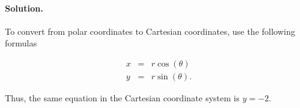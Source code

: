 
\paragraph{Solution.}

To convert from polar coordinates to Cartesian coordinates, use the following formulas

\begin{eqnarray*}
	x&=&r\cos\left(\theta\right)\\
	y&=&r\sin\left(\theta\right).
\end{eqnarray*}

Thus, the same equation in the Cartesian coordinate system is $y=-2$.
